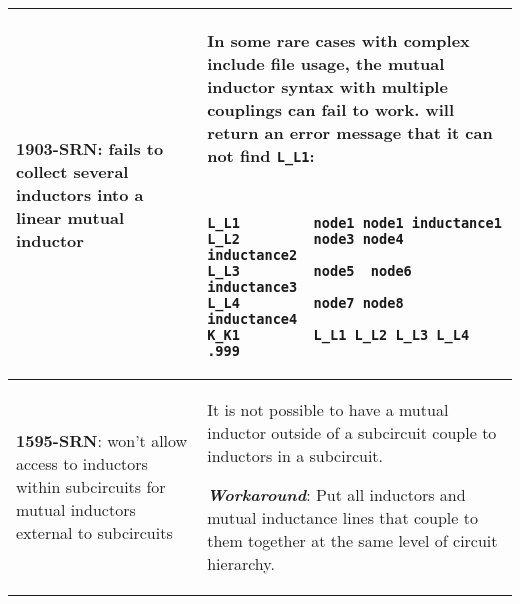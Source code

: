 {\begin{longtable}[h] {>{\raggedright\small}m{2in}|>{\raggedright\let\\\tabularnewline\small}m{3.5in}}
\textbf{1903-SRN}: \Xyce{} fails to collect several inductors into a linear mutual inductor &
In some rare cases with complex include file usage, the mutual inductor syntax with multiple couplings can fail to work. \Xyce{} will return an error message that it can not find 
\texttt{L\_L1}:
{\tt
\begin{verbatim}
L_L1         node1 node1 inductance1
L_L2         node3 node4  inductance2
L_L3         node5  node6  inductance3
L_L4         node7 node8  inductance4
K_K1         L_L1 L_L2 L_L3 L_L4   .999 
\end{verbatim}
}

\\ \hline

\textbf{1595-SRN}: \Xyce{} won't allow access to inductors within subcircuits for
mutual inductors external to subcircuits & It is not possible to have a mutual
inductor outside of a subcircuit couple to inductors in a subcircuit.

\textbf{\textit{Workaround}}: Put all inductors and mutual inductance lines that couple to
them together at the same level of circuit hierarchy.
\\ \hline


\end{longtable}
}
